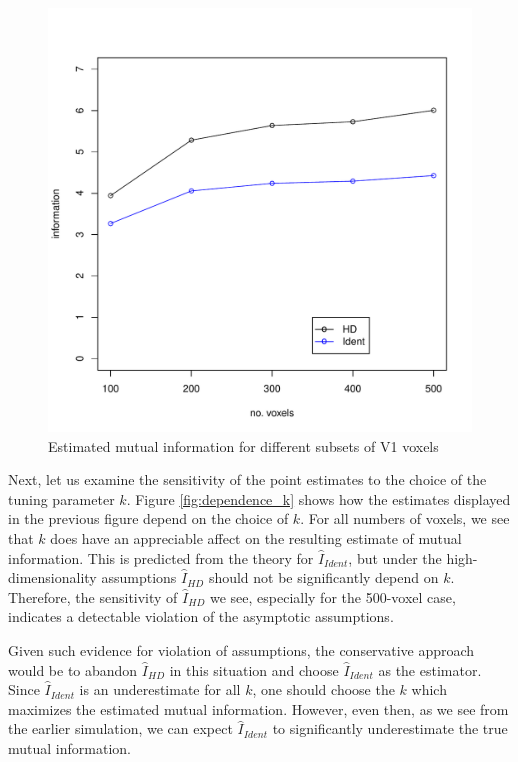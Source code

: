 \begin{figure}
\centering
\includegraphics[scale = 0.5]{../../Yuval/info_infer.pdf}
\caption{Estimated mutual information for different subsets of V1 voxels}
\label{fig:n_voxels_vs_mi}
\end{figure}

Next, let us examine the sensitivity of the point estimates to the
choice of the tuning parameter $k$.  Figure \ref{fig:dependence_k}
shows how the estimates displayed in the previous figure depend on the
choice of $k$.  For all numbers of voxels, we see that $k$ does have
an appreciable affect on the resulting estimate of mutual information.
This is predicted from the theory for $\hat{I}_{Ident}$, but under the
high-dimensionality assumptions $\hat{I}_{HD}$ should not be
significantly depend on $k$.  Therefore, the sensitivity of
$\hat{I}_{HD}$ we see, especially for the 500-voxel case, indicates a
detectable violation of the asymptotic assumptions.

Given such evidence for violation of assumptions, the conservative
approach would be to abandon $\hat{I}_{HD}$ in this situation and
choose $\hat{I}_{Ident}$ as the estimator. Since $\hat{I}_{Ident}$ is
an underestimate for all $k$, one should choose the $k$ which
maximizes the estimated mutual information.  However, even then, as we
see from the earlier simulation, we can expect $\hat{I}_{Ident}$ to
significantly underestimate the true mutual information.

